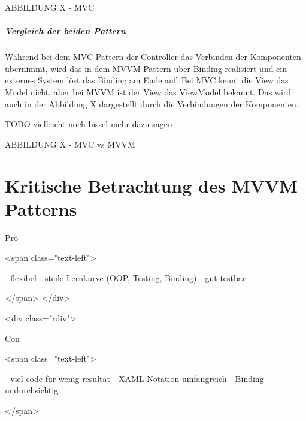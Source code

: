 \documentclass[titlepage=false,12pt]{scrreprt}
\begin{document}
ABBILDUNG X - MVC

\paragraph{Vergleich der beiden Pattern}

Während bei dem MVC Pattern der Controller das Verbinden der Komponenten übernimmt, wird das
in dem MVVM Pattern über Binding realisiert und ein externes System löst das Binding am Ende auf.
Bei MVC kennt die View das Model nicht, aber bei MVVM ist der View das ViewModel bekannt.
Das wird auch in der Abbildung X dargestellt durch die Verbindungen der Komponenten.

TODO vielleicht noch bissel mehr dazu sagen

ABBILDUNG X - MVC vs MVVM

\chapter{Kritische Betrachtung des MVVM Patterns}



Pro

<span class="text-left">

- flexibel
- steile Lernkurve (OOP, Testing, Binding)
- gut testbar

</span>
</div>

<div class="rdiv">

Con

<span class="text-left">

- viel code für wenig resultat
- XAML Notation umfangreich
- Binding undurchsichtig

</span>
\end{document}

